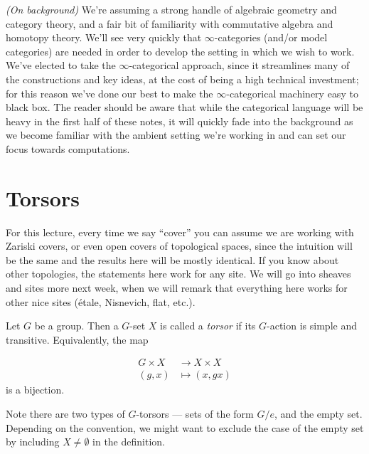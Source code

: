 \documentclass[11pt]{amsart}
\begin{document}
\begin{remark} \textit{(On background)} We're assuming a strong handle of algebraic geometry and category theory, and a fair bit of familiarity with commutative algebra and homotopy theory. We'll see very quickly that $\infty$-categories (and/or model categories) are needed in order to develop the setting in which we wish to work. We've elected to take the $\infty$-categorical approach, since it streamlines many of the constructions and key ideas, at the cost of being a high technical investment; for this reason we've done our best to make the $\infty$-categorical machinery easy to black box. The reader should be aware that while the categorical language will be heavy in the first half of these notes, it will quickly fade into the background as we become familiar with the ambient setting we're working in and can set our focus towards computations.
\end{remark}

\newpage
\section{\sectionheader Torsors}

\begin{assumption} For this lecture, every time we say ``cover'' you can assume we are working with Zariski covers, or even open covers of topological spaces, since the intuition will be the same and the results here will be mostly identical. If you know about other topologies, the statements here work for any site. We will go into sheaves and sites more next week, when we will remark that everything here works for other nice sites (\'etale, Nisnevich, flat, etc.).
\end{assumption}

\begin{definition} Let $G$ be a group. Then a $G$-set $X$ is called a \textit{torsor} if its $G$-action is simple and transitive. Equivalently, the map

\begin{equation}\label{eqn:torsor-G-set}
\begin{aligned}
    G \times X &\to X \times X \\
    (g,x) &\mapsto (x,gx)
\end{aligned}
\end{equation}
is a bijection.
\end{definition}

Note there are two types of $G$-torsors --- sets of the form $G/e$, and the empty set. Depending on the convention, we might want to exclude the case of the empty set by including $X \ne \emptyset$ in the definition.
\end{document}
